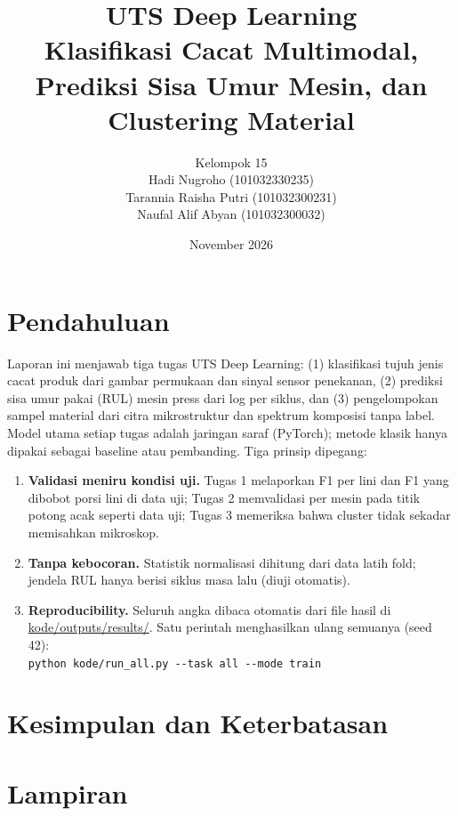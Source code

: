 \documentclass[11pt,a4paper]{article}
\title{UTS Deep Learning\\\large Klasifikasi Cacat Multimodal, Prediksi Sisa Umur Mesin, dan Clustering Material}
\author{Kelompok 15 \\[4pt] Hadi Nugroho (101032330235) \\ Tarannia Raisha Putri (101032300231) \\ Naufal Alif Abyan (101032300032)}
\date{November 2026}
\begin{document}
\maketitle

\section{Pendahuluan}
Laporan ini menjawab tiga tugas UTS Deep Learning: (1) klasifikasi tujuh jenis cacat produk dari gambar permukaan dan sinyal sensor penekanan,
(2) prediksi sisa umur pakai (RUL) mesin press dari log per siklus, dan (3) pengelompokan sampel material dari citra mikrostruktur dan spektrum komposisi tanpa label.
Model utama setiap tugas adalah jaringan saraf (PyTorch); metode klasik hanya dipakai sebagai baseline atau pembanding. Tiga prinsip dipegang:
\begin{enumerate}
  \item \textbf{Validasi meniru kondisi uji.} Tugas 1 melaporkan F1 per lini dan F1 yang dibobot porsi lini di data uji; Tugas 2 memvalidasi per mesin pada titik potong acak seperti data uji;
        Tugas 3 memeriksa bahwa cluster tidak sekadar memisahkan mikroskop.
  \item \textbf{Tanpa kebocoran.} Statistik normalisasi dihitung dari data latih fold; jendela RUL hanya berisi siklus masa lalu (diuji otomatis).
  \item \textbf{Reproducibility.} Seluruh angka dibaca otomatis dari file hasil di \url{kode/outputs/results/}. Satu perintah menghasilkan ulang semuanya (seed 42):\\
        \texttt{python kode/run\_all.py -{}-task all -{}-mode train}
\end{enumerate}





\section{Kesimpulan dan Keterbatasan}


\appendix
\section{Lampiran}

\end{document}
